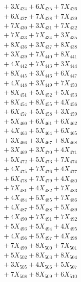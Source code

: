 \documentclass[a4paper,10pt]{article}
\begin{document}
{\begin{align}
&\;  + 3 X_{424} + 6 X_{425} + 7 X_{426} \\[0.3ex]
&\;  + 6 X_{427} + 7 X_{428} + 7 X_{429} \\[0.5ex]\allowbreak
&\;  + 7 X_{430} + 3 X_{431} + 7 X_{432} \\[0.3ex]
&\;  + 7 X_{433} + 7 X_{434} + 3 X_{435} \\[0.3ex]
&\;  + 8 X_{436} + 3 X_{437} + 8 X_{438} \\[0.3ex]
&\;  + 3 X_{439} + 7 X_{440} + 8 X_{441} \\[0.3ex]
&\;  + 4 X_{442} + 7 X_{443} + 3 X_{444} \\[0.3ex]
&\;  + 8 X_{445} + 3 X_{446} + 6 X_{447} \\[0.3ex]
&\;  + 4 X_{448} + 3 X_{449} + 7 X_{450} \\[0.3ex]
&\;  + 8 X_{451} + 5 X_{452} + 5 X_{453} \\[0.3ex]
&\;  + 8 X_{454} + 8 X_{455} + 4 X_{456} \\[0.3ex]
&\;  + 6 X_{457} + 5 X_{458} + 3 X_{459} \\[0.5ex]\allowbreak
&\;  + 5 X_{460} + 6 X_{461} + 6 X_{462} \\[0.3ex]
&\;  + 4 X_{463} + 5 X_{464} + 6 X_{465} \\[0.3ex]
&\;  + 3 X_{466} + 3 X_{467} + 8 X_{468} \\[0.3ex]
&\;  + 3 X_{469} + 3 X_{470} + 4 X_{471} \\[0.3ex]
&\;  + 5 X_{472} + 5 X_{473} + 7 X_{474} \\[0.3ex]
&\;  + 4 X_{475} + 7 X_{476} + 4 X_{477} \\[0.3ex]
&\;  + 6 X_{478} + 7 X_{479} + 4 X_{480} \\[0.3ex]
&\;  + 7 X_{481} + 4 X_{482} + 7 X_{483} \\[0.3ex]
&\;  + 4 X_{484} + 5 X_{485} + 7 X_{486} \\[0.3ex]
&\;  + 4 X_{487} + 5 X_{488} + 5 X_{489} \\[0.5ex]\allowbreak
&\;  + 4 X_{490} + 7 X_{491} + 7 X_{492} \\[0.3ex]
&\;  + 5 X_{493} + 5 X_{494} + 4 X_{495} \\[0.3ex]
&\;  + 4 X_{496} + 5 X_{497} + 4 X_{498} \\[0.3ex]
&\;  + 7 X_{499} + 8 X_{500} + 7 X_{501} \\[0.3ex]
&\;  + 5 X_{502} + 8 X_{503} + 8 X_{504} \\[0.3ex]
&\;  + 3 X_{505} + 4 X_{506} + 5 X_{507} \\[0.3ex]
&\;  + 7 X_{508} + 8 X_{509} + 6 X_{510} \\[0.3ex]

\end{align}}
\end{document}
